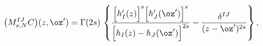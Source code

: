 \begin{equation}
\bigl(M_{s,N}^{IJ}C\bigr)(z,\oz')=\Gamma(2s)\,\left\{
\frac{\Bigl[h_I'(z)\Bigr]^s\Bigl[h_J'(\oz')\Bigr]^s}
{\Bigl[h_I(z)-h_J(\oz')\Bigr]^{2s}}
-\frac{\delta^{IJ}}{(z-\oz')^{2s}}
\right\},
\label{CMs}
\end{equation}

